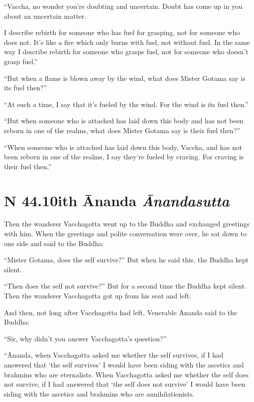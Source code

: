 \documentclass[12pt,openany]{book}%
\newcommand*{\suttatitleacronym}[1]{\smaller[2]{#1}\vspace*{.3em}}
\newcommand*{\suttatitletranslation}[1]{\linebreak{#1}}
\newcommand*{\suttatitleroot}[1]{\linebreak\smaller[2]\itshape{#1}}
\newcommand*{\tocacronym}[1]{\hspace*{-3.3em}{#1}\quad}
\newcommand*{\toctranslation}[1]{#1}
\newcommand*{\tocroot}[1]{(\textit{#1})}
\begin{document}
“Vaccha, no wonder you’re doubting and uncertain. Doubt has come up in you about an uncertain matter. 

I describe rebirth for someone who has fuel for grasping, not for someone who does not. It’s like a fire which only burns with fuel, not without fuel. In the same way I describe rebirth for someone who grasps fuel, not for someone who doesn’t grasp fuel.” 

“But when a flame is blown away by the wind, what does Mister Gotama say is its fuel then?” 

“At such a time, I say that it’s fueled by the wind. For the wind is its fuel then.” 

“But when someone who is attached has laid down this body and has not been reborn in one of the realms, what does Mister Gotama say is their fuel then?” 

“When someone who is attached has laid down this body, Vaccha, and has not been reborn in one of the realms, I say they’re fueled by craving. For craving is their fuel then.” 

%
\section*{{\suttatitleacronym SN 44.10}{\suttatitletranslation With Ānanda }{\suttatitleroot Ānandasutta}}
\addcontentsline{toc}{section}{\tocacronym{SN 44.10} \toctranslation{With Ānanda } \tocroot{Ānandasutta}}

Then the wanderer Vacchagotta went up to the Buddha and exchanged greetings with him. When the greetings and polite conversation were over, he sat down to one side and said to the Buddha: 

“Mister Gotama, does the self survive?” But when he said this, the Buddha kept silent. 

“Then does the self not survive?” But for a second time the Buddha kept silent. Then the wanderer Vacchagotta got up from his seat and left. 

And then, not long after Vacchagotta had left, Venerable Ānanda said to the Buddha: 

“Sir, why didn’t you answer Vacchagotta’s question?” 

“Ānanda, when Vacchagotta asked me whether the self survives, if I had answered that ‘the self survives’ I would have been siding with the ascetics and brahmins who are eternalists. When Vacchagotta asked me whether the self does not survive, if I had answered that ‘the self does not survive’ I would have been siding with the ascetics and brahmins who are annihilationists. 
\end{document}

